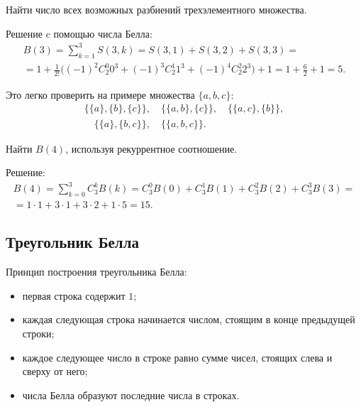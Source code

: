 \begin{example}
    Найти число всех возможных разбиений трехэлементного множества.

    Решение c помощью числа Белла:
    \begin{gather*}
        B(3) =
        \sum_{k = 1}^3 S(3, k) =
        S(3, 1) + S(3, 2) + S(3, 3) = \\ =
        1 + \frac{1}{2!} \Big( (-1)^2 C_2^0 0^3 + (-1)^3 C_2^1 1^3 + (-1)^4 C_2^2 2^3 \Big) + 1 =
        1 + \frac{6}{2} + 1 = 5.
    \end{gather*}

    Это легко проверить на примере множества \(\{a, b, c\}\):
    \begin{gather*}
        \{\{a\}, \{b\}, \{c\}\},
        \quad
        \{\{a, b\}, \{c\}\},
        \quad
        \{\{a, c\}, \{b\}\}, \\
        \quad
        \{\{a\}, \{b, c\}\},
        \quad
        \{\{a, b, c\}\}.
    \end{gather*}
\end{example}

\begin{example}
    Найти \(B(4)\), используя рекуррентное соотношение.

    Решение:
    \begin{gather*}
        B(4) =
        \sum_{k = 0}^3 C_3^k B(k) =
        C_3^0 B(0) + C_3^1 B(1) + C_3^2 B(2) + C_3^3 B(3) = \\ =
        1 \cdot 1 + 3 \cdot 1 + 3 \cdot 2 + 1 \cdot 5 =
        15.
    \end{gather*}
\end{example}

\subsection{Треугольник Белла}

\noindent Принцип построения треугольника Белла:
\begin{itemize}
    \item первая строка содержит \(1\);
    \item каждая следующая строка начинается числом, стоящим в конце предыдущей строки;
    \item каждое следующее число в строке равно сумме чисел, стоящих слева и сверху от него;
    \item числа Белла образуют последние числа в строках.
\end{itemize}

